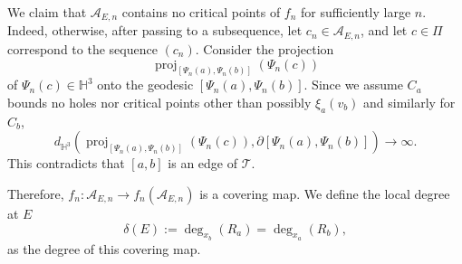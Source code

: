 \documentclass[11pt, reqno]{amsart}
\numberwithin{equation}{section}
\theoremstyle{plain}
\theoremstyle{theorem}
\theoremstyle{definition}
\newcommand{\Hyp}{\mathbb{H}}
\newcommand{\RT}{\mathscr{T}}
\newcommand{\RP}{\Pi}
\DeclareMathOperator{\proj}{proj}
\numberwithin{figure}{section}
\begin{document}
We claim that $\mathcal{A}_{E,n}$ contains no critical points of $f_n$ for sufficiently large $n$.
Indeed, otherwise, after passing to a subsequence, let $c_n \in \mathcal{A}_{E,n}$, and let $c\in \RP$ correspond to the sequence $(c_n)$.
Consider the projection 
$$
\proj_{[\Psi_n(a), \Psi_n(b)]}(\Psi_n(c))
$$ 
of $\Psi_n(c) \in \Hyp^3$ onto the geodesic $[\Psi_n(a), \Psi_n(b)]$.
Since we assume $C_a$ bounds no holes nor critical points other than possibly $\xi_a(v_b)$ and similarly for $C_b$, 
$$
d_{\Hyp^3}(\proj_{[\Psi_n(a), \Psi_n(b)]}(\Psi_n(c)), \partial [\Psi_n(a), \Psi_n(b)]) \to \infty.
$$
This contradicts that $[a, b]$ is an edge of $\RT$.

Therefore, $f_n: \mathcal{A}_{E,n} \longrightarrow f_n(\mathcal{A}_{E,n})$ is a covering map.
We define the local degree at $E$
$$
\delta(E) := \deg_{x_b}(R_a)= \deg_{x_a}(R_b),
$$
as the degree of this covering map.
\end{document}
